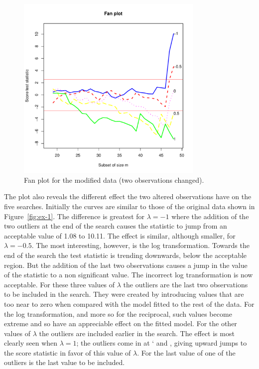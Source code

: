 \documentclass[article,shortnames,nojss]{jss}
\begin{document}
\begin{center}
\begin{figure}[H]
\includegraphics[width=0.8\textwidth]{transreg-ex-3}
\caption{Fan plot for the modified  data (two observations changed).}
\label{fig:ex-3}
\end{figure}
\end{center}

The plot also reveals the different effect the two altered observations have on the five searches. Initially the curves are similar to those of the original data shown in Figure~\ref{fig:ex-1}. The difference is greatest for $\lambda=-1$ where the addition of the two outliers at the end of the search causes the statistic to jump from an acceptable value of 1.08 to 10.11. The effect is similar, although smaller, for $\lambda=-0.5$. The most interesting, however, is the log transformation. Towards the end of the search the test statistic is trending downwards, below the acceptable region. But the addition of the last two observations causes a jump in the value of the statistic to a non significant value. The incorrect log transformation is now acceptable. For these three values of $\lambda$ the outliers are the last two observations to be included in the search. They were created by introducing values that are too near to zero when compared with the model fitted to the rest of the data. For the log transformation, and more so for the reciprocal, such values become extreme and so have an appreciable effect on the fitted model. For the other values of $\lambda$ the outliers are included earlier in the search. The effect is most clearly seen when $\lambda=1$; the outliers come in at ` and , giving upward jumps to the score statistic in favor of this value of $\lambda$. For the last value of  one of the outliers is the last value to be included.
\end{document}
